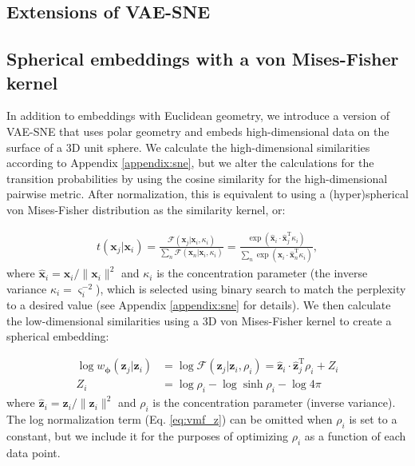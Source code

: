 \documentclass[11pt,a4paper,twoside]{book}
\begin{document}
\begin{doublespace}
\begin{appendices}
\section{Extensions of VAE-SNE}
\label{appendix:extensions}
\subsection{Spherical embeddings with a von Mises-Fisher kernel}
\label{appendix:spherical}
In addition to embeddings with Euclidean geometry, we introduce a version of VAE-SNE that uses polar geometry and embeds high-dimensional data on the surface of a 3D unit sphere. We calculate the high-dimensional similarities according to Appendix \ref{appendix:sne}, but we alter the calculations for the transition probabilities by using the cosine similarity for the high-dimensional pairwise metric. After normalization, this is equivalent to using a (hyper)spherical von Mises-Fisher distribution as the similarity kernel, or:

\begin{align}
     t(\mathbf{x}_j | \mathbf{x}_i) = \frac{\mathcal{F}(\mathbf{x}_j | \mathbf{x}_i, \kappa_i)}{\sum_{n} \mathcal{F}(\mathbf{x}_n | \mathbf{x}_i, \kappa_i)} = \frac{\exp \left(\mathbf{\hat{x}}_i \cdot \mathbf{\hat{x}}_j^{\mathrm{T}} \kappa_i \right)}{\sum_{n} \exp \left(\mathbf{\hat{x}}_i \cdot \mathbf{\hat{x}}_n^{\mathrm{T}} \kappa_i\right)},
\end{align}
where $\mathbf{\hat{x}}_i = \mathbf{x}_i / \|\mathbf{x}_i\|^2$ and $\kappa_i$ is the concentration parameter (the inverse variance $\kappa_i = \varsigma_i^{-2}$), which is selected using binary search to match the perplexity to a desired value (see Appendix \ref{appendix:sne} for details). We then calculate the low-dimensional similarities using a 3D von Mises-Fisher kernel to create a spherical embedding:

\begin{subequations}
    \begin{align}
        \log w_{\boldsymbol{\phi}}(\mathbf{z}_j | \mathbf{z}_i) &= \log \mathcal{F}(\mathbf{z}_j | \mathbf{z}_i, \rho_i) = \mathbf{\hat{z}}_i \cdot \mathbf{\hat{z}}_j^{\mathrm{T}} \rho_i + Z_i \label{eq:vmf_logp}\\
        Z_i &= \log\rho_i - \log\sinh{\rho_i} - \log4\pi \label{eq:vmf_z}
\end{align}
\end{subequations}
where $\mathbf{\hat{z}}_i = \mathbf{z}_i / \|\mathbf{z}_i\|^2$ and $\rho_i$ is the concentration parameter (inverse variance). The log normalization term (Eq. \ref{eq:vmf_z})  can be omitted when $\rho_i$ is set to a constant, but we include it for the purposes of optimizing $\rho_i$ as a function of each data point.


\end{appendices}
\end{doublespace}
\end{document}
